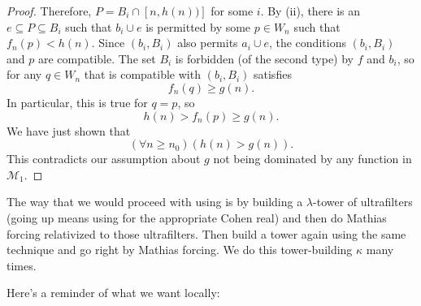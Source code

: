 \documentclass[12pt]{article}\usepackage[english]{babel}
\newcommand{\calM}{\mathcal{M}}
\theoremstyle{definition}
\theoremstyle{remark}
\begin{document}
\begin{proof}
  Therefore, $P = B_i \cap [n, h(n))]$ for some $i$.
  By (ii), there is an $e \subseteq P \subseteq B_i$ such that $b_i \cup e$ is permitted by some $p \in W_n$ such that $f_n(p) < h(n)$.
  Since $(b_i, B_i)$ also permits $a_i \cup e$, the conditions $(b_i, B_i)$ and $p$ are compatible.
  The set $B_i$ is forbidden (of the second type) by $f$ and $b_i$, so for any $q \in W_n$ that is compatible with $(b_i, B_i)$ satisfies
  \[
    f_n(q) \geq g(n).
  \]
  In particular, this is true for $q = p$, so
  \[
    h(n) > f_n(p) \geq g(n).
  \]
  We have just shown that
  \[
    (\forall n \geq n_0) (h(n) > g(n)).
  \]
  This contradicts our assumption about $g$ not being dominated by any function in $\calM_1$.
\end{proof}

The way that we would proceed with using  is by building a $\lambda$-tower of ultrafilters (going up means using  for the appropriate Cohen real) and then do Mathias forcing relativized to those ultrafilters.
Then build a tower again using the same technique and go right by Mathias forcing.
We do this tower-building $\kappa$ many times.

Here's a reminder of what we want locally:
\begin{figure}[htbp]
  \noindent\hspace*{3cm}
\end{figure}
\end{document}
